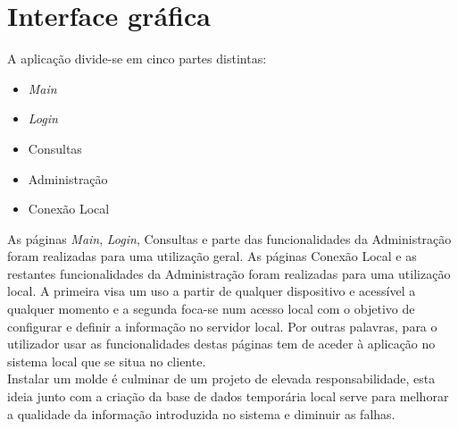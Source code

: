 \documentclass[11pt,twoside,a4paper]{report}
\begin{document}
\section{Interface gráfica}
A aplicação divide-se em cinco partes distintas:
\begin{itemize}[noitemsep]
	\item \textit{Main}
	\item \textit{Login}
	\item Consultas
	\item Administração
	\item Conexão Local
\end{itemize}
As páginas \textit{Main}, \textit{Login}, Consultas e parte das funcionalidades da Administração foram realizadas para uma utilização geral. As páginas Conexão Local e as restantes funcionalidades da Administração foram realizadas para uma utilização local. A primeira visa um uso a partir de qualquer dispositivo e acessível a qualquer momento e a segunda foca-se num acesso local com o objetivo de configurar e definir a informação no servidor local. Por outras palavras, para o utilizador usar as funcionalidades destas páginas tem de aceder à aplicação no sistema local que se situa no cliente.\\
Instalar um molde é culminar de um projeto de elevada responsabilidade, esta ideia junto com a criação da base de dados temporária local serve para melhorar a qualidade da informação introduzida no sistema e diminuir as falhas.\\

\newpage
\end{document}
